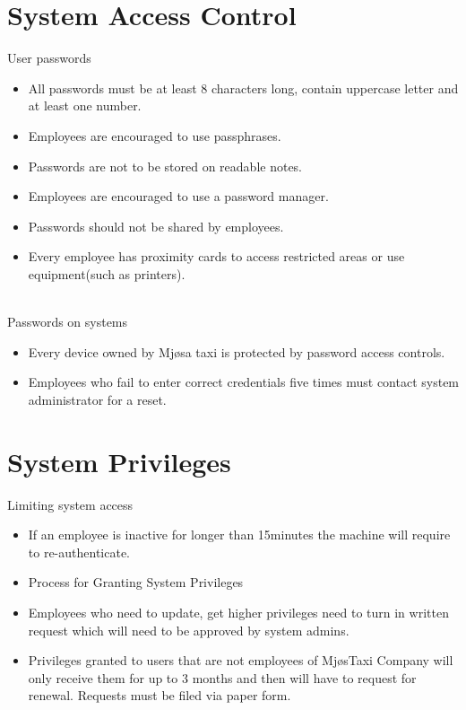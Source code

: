 \section{System Access Control}
User passwords 
    \begin{itemize}[noitemsep]  %
        \item All passwords must be at least 8 characters long, contain uppercase letter and at least one number.
        \item Employees are encouraged to use passphrases.
        \item Passwords are not to be stored on readable notes.
        \item Employees are encouraged to use a password manager.
        \item Passwords should not be shared by employees.
        \item Every employee has proximity cards to access restricted areas or use equipment(such as printers).
    \end{itemize}{} 
\\
Passwords on systems
    \begin{itemize}[noitemsep]
        \item Every device owned by Mjøsa taxi is protected by password access controls.
        \item Employees who fail to enter correct credentials five times must contact system administrator for a reset.
    \end{itemize}{}
    
\section{System Privileges}
Limiting system access
    \begin{itemize}[noitemsep]
        \item If an employee is inactive for longer than 15minutes the machine will require to re-authenticate.
        \item Process for Granting System Privileges
        \item Employees who need to update, get higher privileges need to turn in written request which will need to be approved by system admins.
        \item Privileges granted to users that are not employees of MjøsTaxi Company will only receive them for up to 3 months and then will have to request for renewal. Requests must be filed via paper form.
    \end{itemize}

